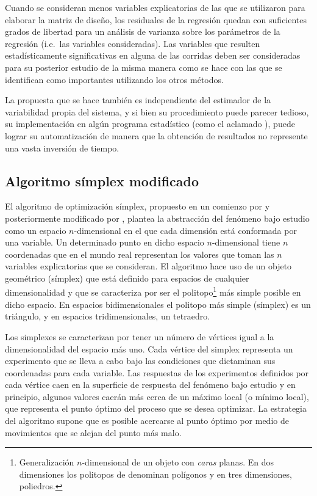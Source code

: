 Cuando se consideran menos variables explicatorias de las que se utilizaron para elaborar la matriz de diseño, los residuales de la regresión quedan con suficientes grados de libertad para un análisis de varianza sobre los parámetros de la regresión (i.e.\ las variables consideradas). Las variables que resulten estadísticamente significativas en alguna de las corridas deben ser consideradas para su posterior estudio de la misma manera como se hace con las que se identifican como importantes utilizando los otros métodos.

La propuesta que se hace también es independiente del estimador de la variabilidad propia del sistema, y si bien su procedimiento puede parecer tedioso, su implementación en algún programa estadístico (como el aclamado \R), puede lograr su automatización de manera que la obtención de resultados no represente una vasta inversión de tiempo.


\subsection{Algoritmo símplex modificado}
El algoritmo de optimización símplex, propuesto en un comienzo por \citet{Spendley1962} y posteriormente modificado por \citet{Nelder1965}, plantea la abstracción del fenómeno bajo estudio como un espacio $n$-dimensional en el que cada dimensión está conformada por una variable. Un determinado punto en dicho espacio $n$-dimensional tiene $n$ coordenadas que en el mundo real representan los valores que toman las $n$ variables explicatorias que se consideran. El algoritmo hace uso de un objeto geométrico (símplex) que está definido para espacios de cualquier dimensionalidad y que se caracteriza por ser el politopo\footnote{Generalización $n$-dimensional de un objeto con \textit{caras} planas. En dos dimensiones los politopos de denominan polígonos y en tres dimensiones, poliedros.} más simple posible en dicho espacio. En espacios bidimensionales el politopo más simple (símplex) es un triángulo, y en espacios tridimensionales, un tetraedro. 

Los simplexes se caracterizan por tener un número de vértices igual a la dimensionalidad del espacio más uno. Cada vértice del simplex representa un experimento que se lleva a cabo bajo las condiciones que dictaminan sus {coordenadas} para cada variable. Las respuestas de los experimentos definidos por cada vértice caen en la superficie de respuesta del fenómeno bajo estudio y en principio, algunos valores caerán más cerca de un máximo local (o mínimo local), que representa el punto óptimo del proceso que se desea optimizar. La estrategia del algoritmo supone que es posible acercarse al punto óptimo por medio de movimientos que se alejan del punto más malo. 

